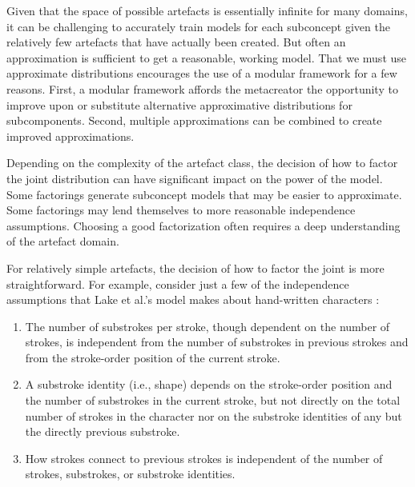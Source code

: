 \documentclass[letterpaper]{article}
\begin{document}
Given that the space of possible artefacts is essentially infinite for many domains, it can be challenging to accurately train models for each subconcept given the relatively few artefacts that have actually been created. But often an approximation is sufficient to get a reasonable, working model. That we must use approximate distributions encourages the use of a modular framework for a few reasons. First, a modular framework affords the metacreator the opportunity to improve upon or substitute alternative approximative distributions for subcomponents. Second, multiple approximations can be combined to create improved approximations.

Depending on the complexity of the artefact class, the decision of how to factor the joint distribution can have significant impact on the power of the model. Some factorings generate subconcept models that may be easier to approximate. Some factorings may lend themselves to more reasonable independence assumptions. Choosing a good factorization often requires a deep understanding of the artefact domain.

For relatively simple artefacts, the decision of how to factor the joint is more straightforward. For example, consider just a few of the independence assumptions that Lake et al.'s model makes about hand-written characters :

\begin{enumerate}  
\item The number of substrokes per stroke, though dependent on the number of strokes, is independent from the number of substrokes in previous strokes and from the stroke-order position of the current stroke.
\item A substroke identity (i.e., shape) depends on the stroke-order position and the number of substrokes in the current stroke, but not directly on the total number of strokes in the character nor on the substroke identities of any but the directly previous substroke.
\item How strokes connect to previous strokes is independent of the number of strokes, substrokes, or substroke identities.
\end{enumerate}
\end{document}
